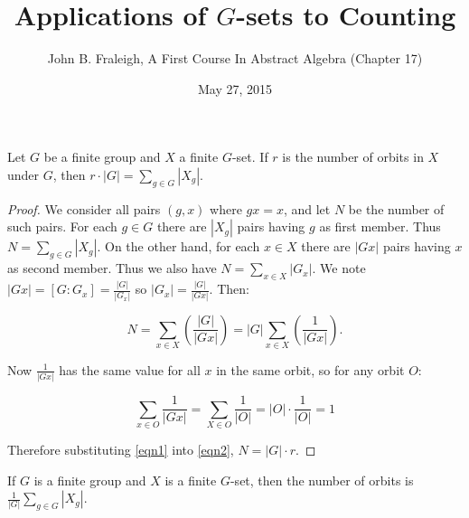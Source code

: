 \documentclass[a4paper,11pt]{article}
\title{Applications of \(G\)-sets to Counting}
\author{John B. Fraleigh, A First Course In Abstract Algebra (Chapter 17)}
\date{May 27, 2015}
\begin{document}
\maketitle
{}

\begin{outline}

    Let \(G\) be a finite group and \(X\) a finite \(G\)-set. If \(r\) is the number of orbits in \(X\) 
    under \(G\), then \(r \cdot |G| = \sum_{g \in G}|X_g|\).
    
    \begin{proof}
      We consider all pairs \((g, x)\) where \(gx = x\), and let \(N\) be the number of such pairs. For each
      \(g \in G\) there are \(|X_g|\) pairs having \(g\) as first member. Thus \(N = \sum_{g \in G}|X_g|\).
      On the other hand, for each \(x \in X\) there are \(|Gx|\) pairs having \(x\) as second member. Thus we also
      have \(N = \sum_{x \in X} |G_x|\). We note \(|Gx| = [G:G_x] = \frac{|G|}{|G_x|}\) so \(|G_x| = \frac{|G|}{|Gx|}\).
      Then:
      
      \begin{equation}
        \label{eqn1}
        N = \sum_{x \in X}(\frac{|G|}{|Gx|}) = |G|\sum_{x \in X} (\frac{1}{|Gx|}).
      \end{equation}
      
      Now \(\frac{1}{|Gx|}\) has the same value for all \(x\) in the same orbit, so for any orbit \(O\):
      
      \begin{equation}
        \label{eqn2}
        \sum_{x \in O} \frac{1}{|Gx|} = \sum_{X \in O} \frac{1}{|O|} = |O| \cdot \frac{1}{|O|} = 1
      \end{equation}
      
      Therefore substituting \eqref{eqn1} into \eqref{eqn2}, \(N = |G| \cdot r\).
    \end{proof}

    If \(G\) is a finite group and \(X\) is a finite \(G\)-set, then the number of orbits is 
    \(\frac{1}{|G|}\sum_{g \in G}|X_g|\).

\end{outline}
\end{document}
